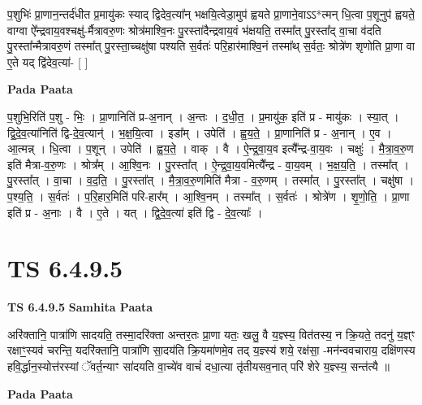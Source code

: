\documentclass[17pt]{extarticle}
\begin{document}
प॒शुभिः॑ प्रा॒णान॒न्तर्द॑धीत प्र॒मायु॑कः स्याद् द्विदेव॒त्या᳚न् भक्षयि॒त्वेडा॒मुप॑ ह्वयते प्रा॒णाने॒वाऽऽ*त्मन् धि॒त्वा प॒शूनुप॑ ह्वयते॒ वाग्वा ऐ᳚न्द्रवाय॒वश्चक्षु॑-र्मैत्रावरु॒णः श्रोत्र॑माश्वि॒नः पु॒रस्ता॑दैन्द्रवाय॒वं भ॑क्षयति॒ तस्मा᳚त् पु॒रस्ता᳚द् वा॒चा व॑दति पु॒रस्ता᳚न्मैत्रावरु॒णं तस्मा᳚त् पु॒रस्ता॒च्चक्षु॑षा पश्यति स॒र्वतः॑ परि॒हार॑माश्वि॒नं तस्मा᳚थ् स॒र्वतः॒ श्रोत्रे॑ण शृणोति प्रा॒णा वा ए॒ते यद् द्वि॑देव॒त्या॑- [  ] \newline

\textbf{Pada Paata} \newline

प॒शुभि॒रिति॑ प॒शु - भिः॒ । प्रा॒णानिति॑ प्र-अ॒नान् । अ॒न्तः । द॒धी॒त॒ । प्र॒मायु॑क॒ इति॑ प्र - मायु॑कः । स्या॒त् । द्वि॒दे॒व॒त्या॑निति॑ द्वि-दे॒व॒त्यान्॑ । भ॒क्ष॒यि॒त्वा । इडा᳚म् । उपेति॑ । ह्व॒य॒ते॒ । प्रा॒णानिति॑ प्र - अ॒नान् । ए॒व । आ॒त्मन्न् । धि॒त्वा । प॒शून् । उपेति॑ । ह्व॒य॒ते॒ । वाक् । वै । ऐ॒न्द्र॒वा॒य॒व इत्यै᳚न्द्र-वा॒य॒वः । चक्षुः॑ । मै॒त्रा॒व॒रु॒ण इति॑ मैत्रा-व॒रु॒णः । श्रोत्र᳚म् । आ॒श्वि॒नः । पु॒रस्ता᳚त् । ऐ॒न्द्र॒वा॒य॒वमित्यै᳚न्द्र - वा॒य॒वम् । भ॒क्ष॒य॒ति॒ । तस्मा᳚त् । पु॒रस्ता᳚त् । वा॒चा । व॒द॒ति॒ । पु॒रस्ता᳚त् । मै॒त्रा॒व॒रु॒णमिति॑ मैत्रा - व॒रु॒णम् । तस्मा᳚त् । पु॒रस्ता᳚त् । चक्षु॑षा । प॒श्य॒ति॒ । स॒र्वतः॑ । प॒रि॒हार॒मिति॑ परि-हार᳚म् । आ॒श्वि॒नम् । तस्मा᳚त् । स॒र्वतः॑ । श्रोत्रे॑ण । शृ॒णो॒ति॒ । प्रा॒णा इति॑ प्र - अ॒नाः । वै । ए॒ते । यत् । द्वि॒दे॒व॒त्या॑ इति॑ द्वि - दे॒व॒त्याः᳚ ।  \newline





\section{ TS 6.4.9.5 }

\textbf{TS 6.4.9.5 } \newline
\textbf{Samhita Paata} \newline

अरि॑क्तानि॒ पात्रा॑णि सादयति॒ तस्मा॒दरि॑क्ता अन्तर॒तः प्रा॒णा यतः॒ खलु॒ वै य॒ज्ञ्स्य॒ वित॑तस्य॒ न क्रि॒यते॒ तदनु॑ य॒ज्ञ्ꣳ रक्षाꣳ॒॒स्यव॑ चरन्ति॒ यदरि॑क्तानि॒ पात्रा॑णि सा॒दय॑ति क्रि॒यमा॑णमे॒व तद् य॒ज्ञ्स्य॑ शये॒ रक्ष॑सा॒ -मन॑न्ववचाराय॒ दक्षि॑णस्य हवि॒र्द्धान॒स्योत्त॑रस्यां ॅवर्त॒न्याꣳ सा॑दयति वा॒च्ये॑व वाचं॑ दधा॒त्या तृ॑तीयसव॒नात् परि॑ शेरे य॒ज्ञ्स्य॒ सन्त॑त्यै ॥ \newline

\textbf{Pada Paata} \newline
\end{document}
